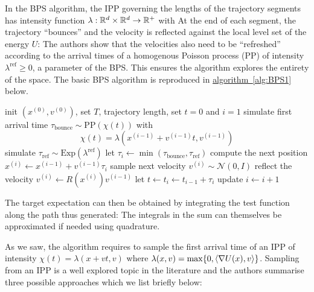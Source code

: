 In the BPS algorithm, the IPP governing the lengths of the trajectory segments has intensity function $\lambda:\mathbb R^{d}\times\mathbb R^{d}\to\mathbb R^{+}$ with
%
%
At the end of each segment, the trajectory ``bounces'' and the velocity is reflected against the local level set of the energy $U$:
The authors show that the velocities also need to be ``refreshed'' according to the arrival times of a homogenous Poisson process (PP) of intensity $\lambda^{\text{ref}}\ge 0$, a parameter of the BPS. This ensures the algorithm explores the entirety of the space. The basic BPS algorithm is reproduced in \hyperref[alg:BPS1]{algorithm~\ref*{alg:BPS1}} below.

\begin{algorithm}[!h]\small
	\caption{\label{alg:BPS1}\small {}}
	\begin{algorithmic}[1]
	\State init $(x^{(0)},v^{(0)})$, set $T$, trajectory length, set $t=0$ and $i=1$
		\State simulate first arrival time $\tau_{\text{bounce}} \sim \text{PP}(\chi(t))$  with
		$$ \chi(t) = \lambda(x^{(i-1)}+v^{(i-1)}t,v^{(i-1)})$$
		\State simulate $\tau_{\text{ref}}\sim \mathrm{Exp}(\lambda^{\text{ref}})$
		\State let $\tau_{i}\leftarrow \min(\tau_{\text{bounce}},\tau_{\text{ref}})$
		\State compute the next position $x^{(i)}\leftarrow x^{(i-1)}+v^{(i-1)}\tau_{i}$
			\State sample next velocity $v^{(i)}\sim \mathcal N(0,I)$		
			\State reflect the velocity $v^{(i)}\leftarrow R(x^{(i)})v^{(i-1)}$
		\EndIf
		\State let $t\leftarrow t_{i}\leftarrow t_{i-1}+\tau_{i}$
		\State update $i\leftarrow i+1$
	\EndWhile
	\end{algorithmic}
\end{algorithm}

The target expectation can then be obtained by integrating the test function along the path thus generated:
The integrals in the sum can themselves be approximated if needed using quadrature.

As we saw, the algorithm requires to sample the first arrival time of an IPP of intensity $\chi(t)=\lambda(x+vt,v)$ where $\lambda(x,v)=\max\{0,\left\langle \nabla U(x),v \right\rangle\}$. Sampling from an IPP is a well explored topic in the literature and the authors summarise three possible approaches which we list briefly below:

